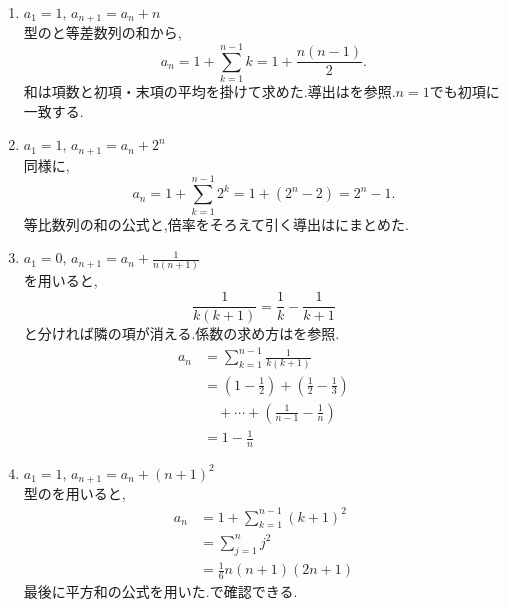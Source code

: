\noindent{}\par\nobreak
\begin{enumerate}[label=(\arabic*),parsep=3pt,format=\bookitemlink{example-difference-1}{solution}{problem}]
  \item $\displaystyle a_1=1,\,a_{n+1}=a_n+n$\\
    型のと等差数列の和から,
    \[
      a_n=1+\sum_{k=1}^{n-1}k=1+\frac{n(n-1)}2.
    \]
    和は項数と初項・末項の平均を掛けて求めた.導出はを参照.$n=1$でも初項に一致する.

  \item $\displaystyle a_1=1,\,a_{n+1}=a_n+2^n$\\
    同様に,
    \[
      a_n=1+\sum_{k=1}^{n-1}2^k=1+(2^n-2)=2^n-1.
    \]
    等比数列の和の公式と,倍率をそろえて引く導出はにまとめた.

  \item $\displaystyle a_1=0,\,a_{n+1}=a_n+\frac{1}{n(n+1)}$\\
    を用いると,
    \[
      \frac{1}{k(k+1)}
      =\frac{1}{k}-\frac{1}{k+1}
    \]
    と分ければ隣の項が消える.係数の求め方はを参照.
    \begin{align*}
      a_n
      &=\sum_{k=1}^{n-1}\frac{1}{k(k+1)}\\
      &=\left(1-\frac12\right)+\left(\frac12-\frac13\right)\\
      &\quad+\cdots+\left(\frac1{n-1}-\frac1n\right)\\
      &=1-\frac1n
    \end{align*}

  \item $\displaystyle a_1=1,\,a_{n+1}=a_n+(n+1)^2$\\
    型のを用いると,
    \begin{align*}
      a_n
      &=1+\sum_{k=1}^{n-1}(k+1)^2\\
      &=\sum_{j=1}^{n}j^2\\
      &=\frac{1}{6}n(n+1)(2n+1)
    \end{align*}
    最後に平方和の公式を用いた.で確認できる.
\end{enumerate}
